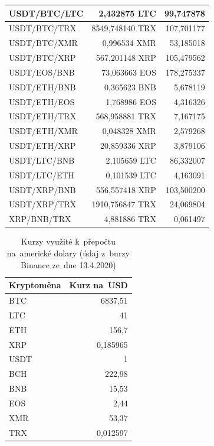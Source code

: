 \documentclass[thesis=B,czech]{FITthesis}[2019/03/21]
\begin{document}
\begin{table}
\begin{tabular}{|| l | r | r ||}
 \hline USDT/BTC/LTC & 2,432875 LTC & 99,747878\\ 
 \hline USDT/BTC/TRX & 8549,748140 TRX & 107,701177\\ 
 \hline USDT/BTC/XMR & 0,996534 XMR & 53,185018\\ 
 \hline USDT/BTC/XRP & 567,201148 XRP & 105,479562\\ 
 \hline USDT/EOS/BNB & 73,063663 EOS & 178,275337\\ 
 \hline USDT/ETH/BNB & 0,365623 BNB & 5,678119\\ 
 \hline USDT/ETH/EOS & 1,768986 EOS & 4,316326\\ 
 \hline USDT/ETH/TRX & 568,958881 TRX & 7,167175\\ 
 \hline USDT/ETH/XMR & 0,048328 XMR & 2,579268\\ 
 \hline USDT/ETH/XRP & 20,859336 XRP & 3,879106\\ 
 \hline USDT/LTC/BNB & 2,105659 LTC & 86,332007\\ 
 \hline USDT/LTC/ETH & 0,101539 LTC & 4,163091\\ 
 \hline USDT/XRP/BNB & 556,557418 XRP & 103,500200\\ 
 \hline USDT/XRP/TRX & 1910,756847 TRX & 24,069804\\ 
 \hline XRP/BNB/TRX & 4,881886 TRX & 0,061497\\ 
 \hline
\end{tabular}
\end{table}

\begin{table}\centering
\caption{Kurzy využité k~přepočtu na~americké dolary (údaj z~burzy Binance ze~dne 13.4.2020)}
\label{table_rates}
\begin{tabular}{|| l | r ||}
\hline Kryptoměna & Kurz na~USD \\ 
\hline\hline BTC & 6837,51 \\ 
\hline LTC & 41 \\ 
\hline ETH & 156,7 \\ 
\hline XRP & 0,185965 \\ 
\hline USDT & 1 \\ 
\hline BCH & 222,98 \\ 
\hline BNB & 15,53 \\ 
\hline EOS & 2,44 \\ 
\hline XMR & 53,37 \\ 
\hline TRX & 0,012597 \\ 
\hline
\end{tabular}
\end{table}
\end{document}
